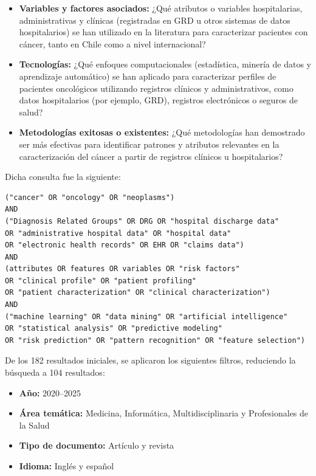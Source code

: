 \begin{itemize}
    \item \textbf{Variables y factores asociados:} ¿Qué atributos o variables hospitalarias, administrativas y clínicas (registradas en GRD u otros sistemas de datos hospitalarios) se han utilizado en la literatura para caracterizar pacientes con cáncer, tanto en Chile como a nivel internacional?
    
    \item \textbf{Tecnologías:} ¿Qué enfoques computacionales (estadística, minería de datos y aprendizaje automático) se han aplicado para caracterizar perfiles de pacientes oncológicos utilizando registros clínicos y administrativos, como datos hospitalarios (por ejemplo, GRD), registros electrónicos o seguros de salud?
    
    \item \textbf{Metodologías exitosas o existentes:} ¿Qué metodologías han demostrado ser más efectivas para identificar patrones y atributos relevantes en la caracterización del cáncer a partir de registros clínicos u hospitalarios?
\end{itemize}


Dicha consulta fue la siguiente:

\begin{lstlisting}[style=query]
("cancer" OR "oncology" OR "neoplasms")
AND
("Diagnosis Related Groups" OR DRG OR "hospital discharge data" 
OR "administrative hospital data" OR "hospital data" 
OR "electronic health records" OR EHR OR "claims data")
AND
(attributes OR features OR variables OR "risk factors" 
OR "clinical profile" OR "patient profiling" 
OR "patient characterization" OR "clinical characterization")
AND
("machine learning" OR "data mining" OR "artificial intelligence" 
OR "statistical analysis" OR "predictive modeling" 
OR "risk prediction" OR "pattern recognition" OR "feature selection")
\end{lstlisting}


De los 182 resultados iniciales, se aplicaron los siguientes filtros, reduciendo la búsqueda a 104 resultados:
\begin{itemize}
    \item \textbf{Año:} 2020--2025
    \item \textbf{Área temática:} Medicina, Informática, Multidisciplinaria y Profesionales de la Salud
    \item \textbf{Tipo de documento:} Artículo y revista
    \item \textbf{Idioma:} Inglés y español
\end{itemize}

